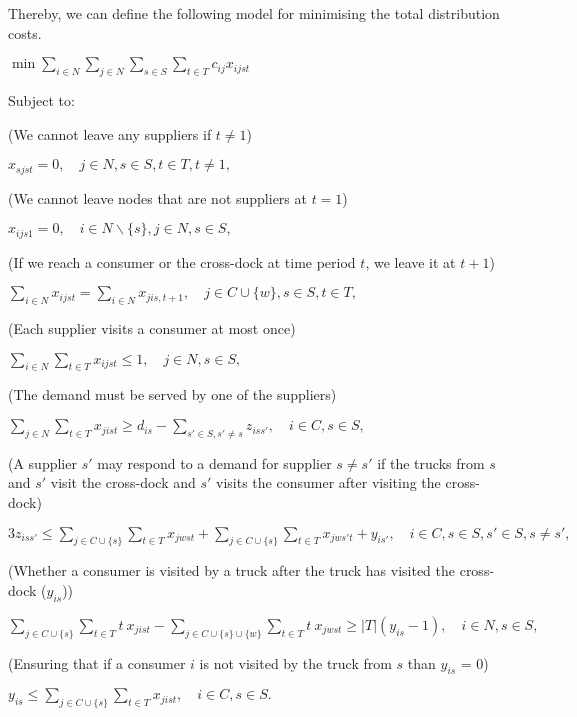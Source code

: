 \documentclass[11pt]{article}
\begin{document}
Thereby, we can define the following model for minimising the total
distribution costs.

\(\displaystyle \min \sum_{i \in N} \sum_{j \in N} \sum_{s \in S} \sum_{t \in T} c_{ij} x_{ijst}\)

Subject to:

(We cannot leave any suppliers if \(t \neq 1\))

\(\displaystyle x_{sjst} = 0, \quad j \in N, s \in S, t \in T, t \neq 1,\)

(We cannot leave nodes that are not suppliers at \(t = 1\))

\(\displaystyle x_{ijs1} = 0, \quad i \in N \backslash \{s\}, j \in N, s \in S,\)

(If we reach a consumer or the cross-dock at time period \(t\), we leave
it at \(t+1\))

\(\displaystyle \sum_{i \in N} x_{ijst} = \sum_{i \in N} x_{jis,t+1}, \quad j \in C \cup \{w\}, s \in S, t \in T,\)

(Each supplier visits a consumer at most once)

\(\displaystyle \sum_{i \in N} \sum_{t \in T} x_{ijst} \leq 1, \quad j \in N, s \in S,\)

(The demand must be served by one of the suppliers)

\(\displaystyle \sum_{j \in N} \sum_{t \in T} x_{jist} \geq d_{is} - \sum_{s' \in S, s' \neq s} z_{iss'}, \quad i \in C, s \in S,\)

(A supplier \(s'\) may respond to a demand for supplier \(s \neq s'\) if
the trucks from \(s\) and \(s'\) visit the cross-dock and \(s'\) visits
the consumer after visiting the cross-dock)

\(\displaystyle 3z_{iss'} \leq \sum_{j \in C \cup \{s\}} \sum_{t \in T} x_{jwst} + \sum_{j \in C \cup \{s\}} \sum_{t \in T} x_{jws't} + y_{is'}, \quad i \in C, s \in S, s' \in S, s \neq s',\)

(Whether a consumer is visited by a truck after the truck has visited
the cross-dock (\(y_{is}\)))

\(\displaystyle \sum_{j \in C\cup \{s\}} \sum_{t \in T} t\ x_{jist} - \sum_{j \in C \cup \{s\} \cup \{w\}} \sum_{t \in T} t\ x_{jwst} \geq |T| (y_{is}-1), \quad i \in N, s \in S,\)

(Ensuring that if a consumer \(i\) is not visited by the truck from
\(s\) than \(y_{is}\) = 0)

\(\displaystyle y_{is} \leq \sum_{j \in C \cup \{s\}} \sum_{t \in T} x_{jist}, \quad i \in C, s \in S.\)
\end{document}

